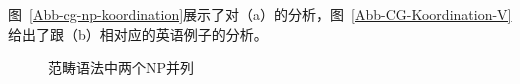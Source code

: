 \begin{exe}
\begin{xlist}[iv.]
\begin{exe}
\begin{xlist}[iv.]
{}
图~\vref{Abb-cg-np-koordination}展示了对（a）的分析，图~\vref{Abb-CG-Koordination-V}给出了跟（b）相对应的英语例子的分析。
\begin{figure}
\centerline{%
}
\caption{\label{Abb-cg-np-koordination}范畴语法中两个NP并列}
\end{figure}%


\end{xlist}
\end{exe}
\end{xlist}
\end{exe}
